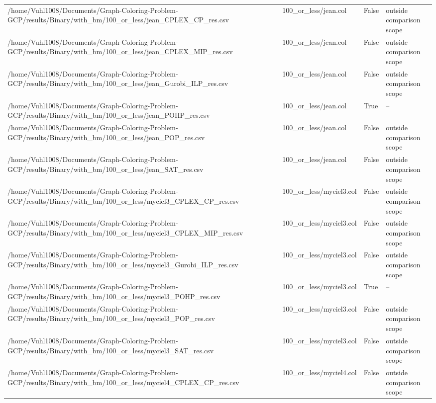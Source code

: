\begin{table}[htbp]
\begin{tabular}{llll}
/home/Vuhl1008/Documents/Graph-Coloring-Problem-GCP/results/Binary/with\_bm/100\_or\_less/jean\_CPLEX\_CP\_res.csv & 100\_or\_less/jean.col & False & outside comparison scope \\
/home/Vuhl1008/Documents/Graph-Coloring-Problem-GCP/results/Binary/with\_bm/100\_or\_less/jean\_CPLEX\_MIP\_res.csv & 100\_or\_less/jean.col & False & outside comparison scope \\
/home/Vuhl1008/Documents/Graph-Coloring-Problem-GCP/results/Binary/with\_bm/100\_or\_less/jean\_Gurobi\_ILP\_res.csv & 100\_or\_less/jean.col & False & outside comparison scope \\
/home/Vuhl1008/Documents/Graph-Coloring-Problem-GCP/results/Binary/with\_bm/100\_or\_less/jean\_POHP\_res.csv & 100\_or\_less/jean.col & True & -- \\
/home/Vuhl1008/Documents/Graph-Coloring-Problem-GCP/results/Binary/with\_bm/100\_or\_less/jean\_POP\_res.csv & 100\_or\_less/jean.col & False & outside comparison scope \\
/home/Vuhl1008/Documents/Graph-Coloring-Problem-GCP/results/Binary/with\_bm/100\_or\_less/jean\_SAT\_res.csv & 100\_or\_less/jean.col & False & outside comparison scope \\
/home/Vuhl1008/Documents/Graph-Coloring-Problem-GCP/results/Binary/with\_bm/100\_or\_less/myciel3\_CPLEX\_CP\_res.csv & 100\_or\_less/myciel3.col & False & outside comparison scope \\
/home/Vuhl1008/Documents/Graph-Coloring-Problem-GCP/results/Binary/with\_bm/100\_or\_less/myciel3\_CPLEX\_MIP\_res.csv & 100\_or\_less/myciel3.col & False & outside comparison scope \\
/home/Vuhl1008/Documents/Graph-Coloring-Problem-GCP/results/Binary/with\_bm/100\_or\_less/myciel3\_Gurobi\_ILP\_res.csv & 100\_or\_less/myciel3.col & False & outside comparison scope \\
/home/Vuhl1008/Documents/Graph-Coloring-Problem-GCP/results/Binary/with\_bm/100\_or\_less/myciel3\_POHP\_res.csv & 100\_or\_less/myciel3.col & True & -- \\
/home/Vuhl1008/Documents/Graph-Coloring-Problem-GCP/results/Binary/with\_bm/100\_or\_less/myciel3\_POP\_res.csv & 100\_or\_less/myciel3.col & False & outside comparison scope \\
/home/Vuhl1008/Documents/Graph-Coloring-Problem-GCP/results/Binary/with\_bm/100\_or\_less/myciel3\_SAT\_res.csv & 100\_or\_less/myciel3.col & False & outside comparison scope \\
/home/Vuhl1008/Documents/Graph-Coloring-Problem-GCP/results/Binary/with\_bm/100\_or\_less/myciel4\_CPLEX\_CP\_res.csv & 100\_or\_less/myciel4.col & False & outside comparison scope \\

\end{tabular}
\end{table}
